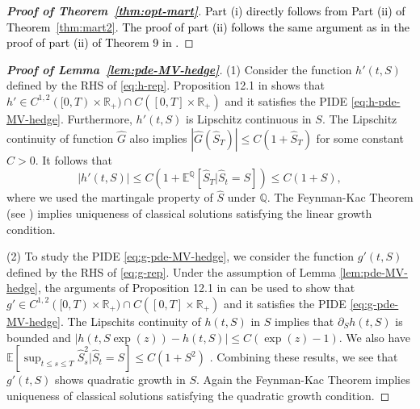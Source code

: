 \documentclass[11pt]{article}
\newcommand{\1}{\mathbbm{1}}
\newcommand{\rev}[1]{\textcolor{black}{{#1}}} %
\begin{document}


\begin{proof}[\bf Proof of Theorem~\ref{thm:opt-mart}]
\rev{Part (i) directly follows from Part (ii) of Theorem~\ref{thm:mart2}. The proof of part (ii) follows the same argument as in the proof of part (ii) of Theorem 9 in \cite{jia2025erratum}.}
\end{proof}



\begin{proof}[\bf Proof of Lemma~\ref{lem:pde-MV-hedge}]
	(1) Consider the function $h'(t,S)$ defined by the RHS of \eqref{eq:h-rep}. Proposition 12.1 in \cite{tankov2004financial} shows that $h'\in C^{1,2}([0,T)\times\mathbb{R}_{+})\cap C([0,T]\times\mathbb{R}_{+})$ and it satisfies the PIDE \eqref{eq:h-pde-MV-hedge}. Furthermore, $h'(t,S)$ is Lipschitz continuous in $S$. The Lipschitz continuity of function $\hat{G}$ also implies $|\hat{G}(\hat{S}_T)|\leq C(1+\hat{S}_T)$ for some constant $C>0$. It follows that
	\begin{equation}
		|h'(t,S)|\leq C(1+ \mathbb{E}^{\mathbb{Q}}[\hat{S}_T|\hat{S}_t=S]) \leq C(1+S),
	\end{equation}
	where we used the martingale property of $\hat{S}$ under $\mathbb{Q}$. The Feynman-Kac Theorem (see \cite{zhu2015feynman}) implies uniqueness of classical solutions satisfying the linear growth condition.
	
	(2) To study the PIDE \eqref{eq:g-pde-MV-hedge}, we consider the function $g'(t,S)$ defined by the RHS of \eqref{eq:g-rep}.
	Under the assumption of Lemma \ref{lem:pde-MV-hedge}, the arguments of Proposition 12.1 in \cite{tankov2004financial} can be used to show that $g'\in C^{1,2}([0,T)\times\mathbb{R}_{+})\cap C([0,T]\times\mathbb{R}_{+})$ and it satisfies the PIDE \eqref{eq:g-pde-MV-hedge}. The Lipschits continuity of $h(t,S)$ in $S$ implies that $\partial_Sh(t,S)$ is bounded and $|h(t,S\exp(z))-h(t,S)|\leq C(\exp(z)-1)$. We also have $\mathbb{E}[\sup_{t\leq s\leq T}\hat{S}_s^2|\hat{S}_t=S]\leq C(1+S^2)$ \cite[Theorem 3.2]{kunita2004stochastic}. Combining these results, we see that $g'(t,S)$ shows quadratic growth in $S$. Again the Feynman-Kac Theorem implies uniqueness of classical solutions satisfying the quadratic growth condition.
\end{proof}
\end{document}
